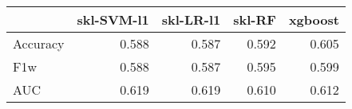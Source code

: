 \begin{tabular}{lrrrr}
\toprule
{} &  skl-SVM-l1 &  skl-LR-l1 &  skl-RF &  xgboost \\
\midrule
Accuracy &       0.588 &      0.587 &   0.592 &    0.605 \\
F1w      &       0.588 &      0.587 &   0.595 &    0.599 \\
AUC      &       0.619 &      0.619 &   0.610 &    0.612 \\
\bottomrule
\end{tabular}
